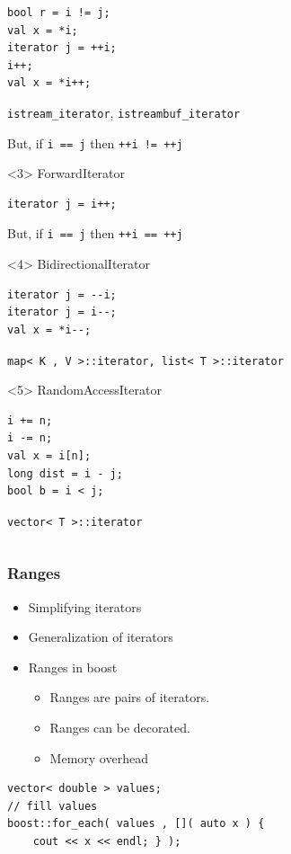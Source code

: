 \documentclass{beamer}
\newcommand{\heading}[1]{\frametitle{#1}}
\begin{document}
{\begin{frame}[fragile]
\begin{columns}[T]
\begin{column}{0.55\textwidth}
\begin{onlyenv}
         \begin{lstlisting}
bool r = i != j;
val x = *i;
iterator j = ++i;
i++;
val x = *i++;
         \end{lstlisting}
{\tt istream\_iterator}, {\tt istreambuf\_iterator}

          \vspace{2ex}
          But, if {\tt i == j} then {\tt ++i != ++j}
      \end{onlyenv}
      \begin{onlyenv}<3>
         ForwardIterator
         \begin{lstlisting}
iterator j = i++;
         \end{lstlisting}

          \vspace{2ex}
          But, if {\tt i == j} then {\tt ++i == ++j}
      \end{onlyenv}
      \begin{onlyenv}<4>
         BidirectionalIterator
         \begin{lstlisting}
iterator j = --i;
iterator j = i--;
val x = *i--;
         \end{lstlisting}
         {\tt map< K , V >::iterator, list< T >::iterator}
      \end{onlyenv}
      \begin{onlyenv}<5>
         RandomAccessIterator
         \begin{lstlisting}
i += n;
i -= n;
val x = i[n];
long dist = i - j;
bool b = i < j;
         \end{lstlisting}
         {\tt vector< T >::iterator}
      \end{onlyenv}
    \end{column}
  \end{columns}
\end{frame}
}


\begin{frame}[fragile]
  \heading{Ranges}
  
  \begin{itemize}
   \item Simplifying iterators
   \item Generalization of iterators
   \item Ranges in boost
   \begin{itemize}
    \item Ranges are pairs of iterators.
    \item Ranges can be decorated.
    \item Memory overhead
   \end{itemize}
  \end{itemize}


  \begin{lstlisting}[basicstyle=\scriptsize\ttfamily]
vector< double > values;
// fill values
boost::for_each( values , []( auto x ) {
    cout << x << endl; } );
  \end{lstlisting}


\end{frame}
\end{document}
